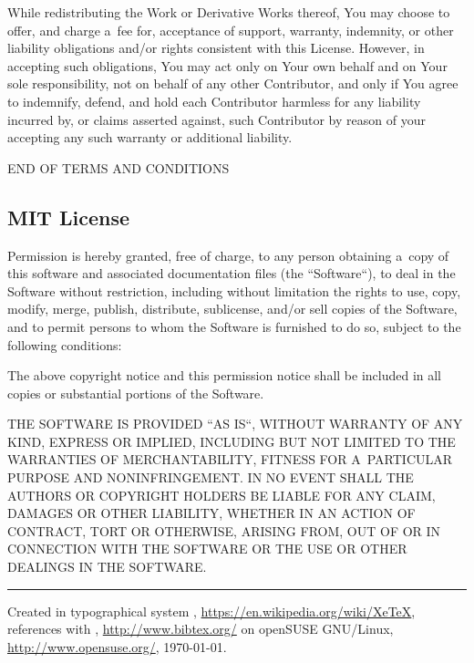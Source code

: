 \documentclass[a4paper, 11pt, twoside]{article}
\begin{document}
While redistributing the Work or Derivative Works thereof, You may choose to offer, and charge a~fee for, acceptance of support, warranty, indemnity, or other liability obligations and/or rights consistent with this License. However, in accepting such obligations, You may act only on Your own behalf and on Your sole responsibility, not on behalf of any other Contributor, and only if You agree to indemnify, defend, and hold each Contributor harmless for any liability incurred by, or claims asserted against, such Contributor by reason of your accepting any such warranty or additional liability.

END OF TERMS AND CONDITIONS

\subsection{MIT License}

Permission is hereby granted, free of charge, to any person obtaining a~copy of this software and associated documentation files (the “Software“), to deal in the Software without restriction, including without limitation the rights to use, copy, modify, merge, publish, distribute, sublicense, and/or sell copies of the Software, and to permit persons to whom the Software is furnished to do so, subject to the following conditions:

The above copyright notice and this permission notice shall be included in all copies or substantial portions of the Software.

THE SOFTWARE IS PROVIDED “AS IS“, WITHOUT WARRANTY OF ANY KIND, EXPRESS OR IMPLIED, INCLUDING BUT NOT LIMITED TO THE WARRANTIES OF MERCHANTABILITY, FITNESS FOR A~PARTICULAR PURPOSE AND NONINFRINGEMENT. IN NO EVENT SHALL THE AUTHORS OR COPYRIGHT HOLDERS BE LIABLE FOR ANY CLAIM, DAMAGES OR OTHER LIABILITY, WHETHER IN AN ACTION OF CONTRACT, TORT OR OTHERWISE, ARISING FROM, OUT OF OR IN CONNECTION WITH THE SOFTWARE OR THE USE OR OTHER DEALINGS IN THE SOFTWARE.

\endgroup



\vfill
\hrule
\vfill
\begin{tiny}
  Created in typographical system , \url{https://en.wikipedia.org/wiki/XeTeX}, references with , \url{http://www.bibtex.org/} on openSUSE GNU/Linux, \url{http://www.opensuse.org/}, \today.
\end{tiny}
\end{document}
